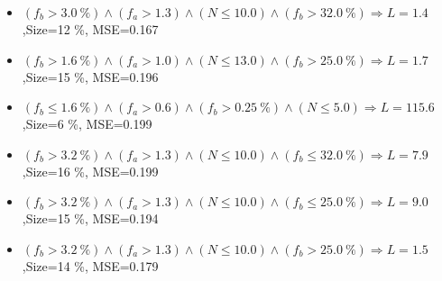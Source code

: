 \documentclass[numbered]{CSL}
\begin{document}
\begin{itemize}
\item $(f_b > 3.0~\%) \land (f_a > 1.3) \land (N \leq 10.0) \land (f_b > 32.0~\%) \Rightarrow L = 1.4$,\hfill Size=12 \%, MSE=0.167
\item $(f_b > 1.6~\%) \land (f_a > 1.0) \land (N \leq 13.0) \land (f_b > 25.0~\%) \Rightarrow L = 1.7$,\hfill Size=15 \%, MSE=0.196
\item $(f_b \leq 1.6~\%) \land (f_a > 0.6) \land (f_b > 0.25~\%) \land (N \leq 5.0) \Rightarrow L = 115.6$,\hfill Size=6 \%, MSE=0.199
\item $(f_b > 3.2~\%) \land (f_a > 1.3) \land (N \leq 10.0) \land (f_b \leq 32.0~\%) \Rightarrow L = 7.9$,\hfill Size=16 \%, MSE=0.199
\item $(f_b > 3.2~\%) \land (f_a > 1.3) \land (N \leq 10.0) \land (f_b \leq 25.0~\%) \Rightarrow L = 9.0$,\hfill Size=15 \%, MSE=0.194
\item $(f_b > 3.2~\%) \land (f_a > 1.3) \land (N \leq 10.0) \land (f_b > 25.0~\%) \Rightarrow L = 1.5$,\hfill Size=14 \%, MSE=0.179
\end{itemize}
\end{document}
